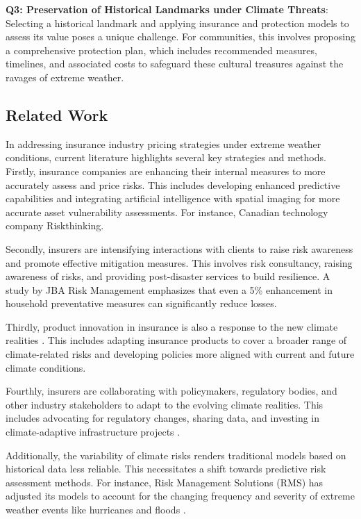 \documentclass[12pt]{article}
\begin{document}
\textbf{Q3: Preservation of Historical Landmarks under Climate Threats}: Selecting a historical landmark and applying insurance and protection models to assess its value poses a unique challenge. For communities, this involves proposing a comprehensive protection plan, which includes recommended measures, timelines, and associated costs to safeguard these cultural treasures against the ravages of extreme weather.
\subsection{Related Work}
In addressing insurance industry pricing strategies under extreme weather conditions, current literature highlights several key strategies and methods. Firstly, insurance companies are enhancing their internal measures to more accurately assess and price risks. This includes developing enhanced predictive capabilities and integrating artificial intelligence with spatial imaging for more accurate asset vulnerability assessments. For instance, Canadian technology company Riskthinking. \cite{fraisse2006agclimate}

Secondly, insurers are intensifying interactions with clients to raise risk awareness and promote effective mitigation measures. This involves risk consultancy, raising awareness of risks, and providing post-disaster services to build resilience. A study by JBA Risk Management emphasizes that even a 5\% enhancement in household preventative measures can significantly reduce losses. \cite{jarzabkowski2019insurance}

Thirdly, product innovation in insurance is also a response to the new climate realities \cite{vermeulen2001organizing}. This includes adapting insurance products to cover a broader range of climate-related risks and developing policies more aligned with current and future climate conditions.

Fourthly, insurers are collaborating with policymakers, regulatory bodies, and other industry stakeholders to adapt to the evolving climate realities. This includes advocating for regulatory changes, sharing data, and investing in climate-adaptive infrastructure projects \cite{mills2009global}.

Additionally, the variability of climate risks renders traditional models based on historical data less reliable. This necessitates a shift towards predictive risk assessment methods. For instance, Risk Management Solutions (RMS) has adjusted its models to account for the changing frequency and severity of extreme weather events like hurricanes and floods \cite{weinkle2020experts}.
\end{document}
